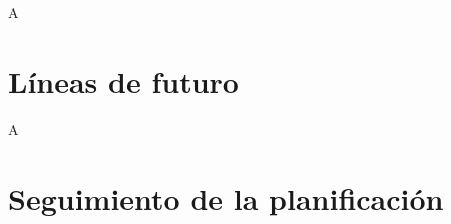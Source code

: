 \documentclass[IB,BIB]{TFUOC}%
\begin{document}
% 

A


\section{Líneas de futuro}
\label{sec:Líneas de futuro}


A


\section{Seguimiento de la planificación}
\label{sec:Seguimiento de la planificación}

\end{document}
